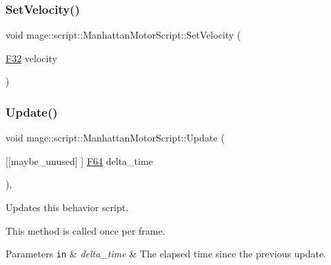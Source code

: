 \hypertarget{classmage_1_1script_1_1_manhattan_motor_script_acf4db52ae6b0c9f97c0b7e719acea6bc}{}\label{classmage_1_1script_1_1_manhattan_motor_script_acf4db52ae6b0c9f97c0b7e719acea6bc} 
\subsubsection{\texorpdfstring{Set\+Velocity()}{SetVelocity()}}
{\footnotesize\ttfamily void mage\+::script\+::\+Manhattan\+Motor\+Script\+::\+Set\+Velocity (\begin{DoxyParamCaption}\item[{\hyperlink{namespacemage_aa97e833b45f06d60a0a9c4fc22ae02c0}{F32}}]{velocity }\end{DoxyParamCaption})\hspace{0.3cm}{\ttfamily [noexcept]}}

\hypertarget{classmage_1_1script_1_1_manhattan_motor_script_ae7fbaba1da04d00257e5d491868efc53}{}\label{classmage_1_1script_1_1_manhattan_motor_script_ae7fbaba1da04d00257e5d491868efc53} 
\subsubsection{\texorpdfstring{Update()}{Update()}}
{\footnotesize\ttfamily void mage\+::script\+::\+Manhattan\+Motor\+Script\+::\+Update (\begin{DoxyParamCaption}\item[{\mbox{[}\mbox{[}maybe\+\_\+unused\mbox{]} \mbox{]} \hyperlink{namespacemage_ad26233bbec640deda836e572c1a23708}{F64}}]{delta\+\_\+time }\end{DoxyParamCaption})\hspace{0.3cm}{\ttfamily [override]}, {\ttfamily [virtual]}}

Updates this behavior script.

This method is called once per frame.


\begin{DoxyParams}[1]{Parameters}
\mbox{\tt in}  & {\em delta\+\_\+time} & The elapsed time since the previous update. \\
\hline
\end{DoxyParams}

